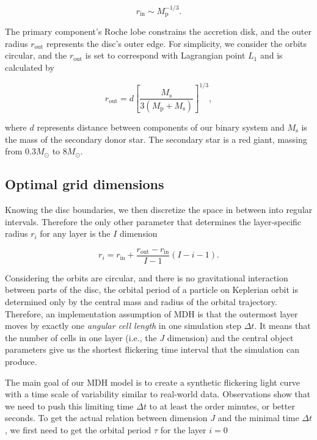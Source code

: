 \begin{equation}
    r_{\text{in}} \sim M_{\text{p}}^{-1/3}.
\end{equation}

The primary component's Roche lobe constrains the accretion disk, and the outer radius $r_{\text{out}}$ represents the disc's outer edge. For simplicity, we consider the orbits circular, and the $r_{\text{out}}$ is set to correspond with Lagrangian point $L_1$ and is calculated by

\begin{equation}
    r_{\text{out}} = d \left[ \frac{M_{\text{s}}}{3 (M_{\text{p}}+M_{\text{s}})} \right]^{1/3},
\end{equation}

where $d$ represents distance between components of our binary system and $M_{\text{s}}$ is the mass of the secondary donor star. The secondary star is a red giant, massing from $0.3M_{\odot}$ to $8M_{\odot}$. 

\subsection{Optimal grid dimensions}

Knowing the disc boundaries, we then discretize the space in between into regular intervals. Therefore the only other parameter that determines the layer-specific radius $r_i$ for any layer is the $I$ dimension

\begin{equation}
    r_i = r_{\text{in}} + \frac{r_{\text{out}} - r_{\text{in}}}{I - 1} (I - i - 1).
\end{equation}

Considering the orbits are circular, and there is no gravitational interaction between parts of the disc, the orbital period of a particle on Keplerian orbit is determined only by the central mass and radius of the orbital trajectory. Therefore, an implementation assumption of MDH is that the outermost layer moves by exactly one \emph{angular cell length} in one simulation step $\Delta t$. It means that the number of cells in one layer (i.e., the $J$ dimension) and the central object parameters give us the shortest flickering time interval that the simulation can produce.

The main goal of our MDH model is to create a synthetic flickering light curve with a time scale of variability similar to real-world data. Observations show that we need to push this limiting time $\Delta t$ to at least the order minutes, or better seconds. To get the actual relation between dimension $J$ and the minimal time $\Delta t$, we first need to get the orbital period $\tau$ for the layer $i=0$

